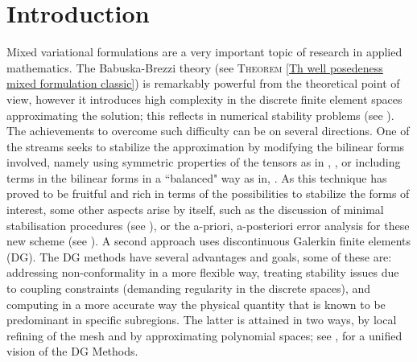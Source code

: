\documentclass[3p]{elsarticle}
\begin{document}


%
%

%
%
%
%
%
\section{Introduction}   %
%
%
%
%
Mixed variational formulations are a very important topic of research in applied mathematics. The Babuska-Brezzi theory (see \textsc{Theorem} \ref{Th well posedeness mixed formulation classic}) is remarkably powerful from the theoretical point of view, however it introduces high complexity in the discrete finite element spaces approximating the solution; this reflects in numerical stability problems  (see \cite{Hughes}). The achievements to overcome such difficulty can be on several directions. One of the streams seeks to stabilize the approximation by modifying the bilinear forms involved, namely using symmetric properties of the tensors as in  \cite{Gatica2}, \cite{Gatica1}, or including terms in the bilinear forms in a ``balanced" way as in\cite{FortinBrezzi2}, \cite{Hughes}. As this technique has proved to be fruitful and rich in terms of the possibilities to stabilize the forms of interest, some other aspects arise by itself, such as the discussion of minimal stabilisation procedures (see \cite{FortinBrezzi3}), or the a-priori, a-posteriori error analysis for these new scheme (see \cite{Gatica2}). A second approach uses discontinuous Galerkin finite elements (DG). The DG methods have several advantages and goals, some of these are: addressing non-conformality in a more flexible way, treating stability issues due to coupling constraints (demanding regularity in the discrete spaces), and computing in a more accurate way the physical quantity that is known to be predominant in specific subregions. The latter is attained in two ways, by local refining of the mesh and by approximating polynomial spaces; see \cite{Brezzi1}, \cite{Cockburn} for a unified vision of the DG Methods.   
\end{document}
